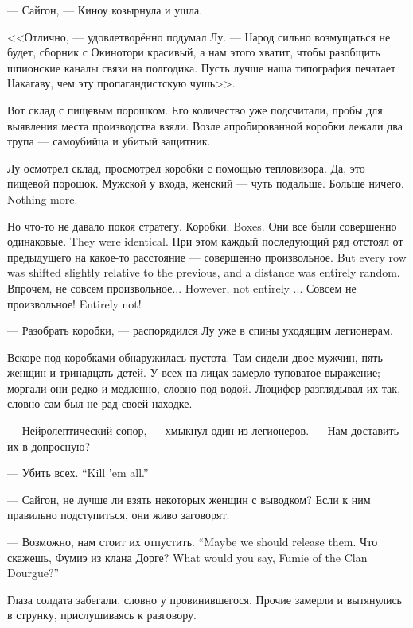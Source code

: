 --- Сайгон, --- Киноу козырнула и ушла.

<<Отлично, --- удовлетворённо подумал Лу.
--- Народ сильно возмущаться не будет, сборник с Окинотори красивый, а нам этого хватит, чтобы разобщить шпионские каналы связи на полгодика.
Пусть лучше наша типография печатает Накагаву, чем эту пропагандистскую чушь>>.

Вот склад с пищевым порошком.
Его количество уже подсчитали, пробы для выявления места производства взяли.
Возле апробированной коробки лежали два трупа --- самоубийца и убитый защитник.

Лу осмотрел склад, просмотрел коробки с помощью тепловизора.
Да, это пищевой порошок.
Мужской у входа, женский --- чуть подальше.
{Больше ничего.}
{Nothing more.}

Но что-то не давало покоя стратегу.
{Коробки.}
{Boxes.}
{Они все были совершенно одинаковые.}
{They were identical.}
{При этом каждый последующий ряд отстоял от предыдущего на какое-то расстояние --- совершенно произвольное.}
{But every row was shifted slightly relative to the previous, and a distance was entirely random.}
{Впрочем, не совсем произвольное...}
{However, not entirely ...}
{Совсем не произвольное!}
{Entirely not!}

--- Разобрать коробки, --- распорядился Лу уже в спины уходящим легионерам.

Вскоре под коробками обнаружилась пустота.
Там сидели двое мужчин, пять женщин и тринадцать детей.
У всех на лицах замерло туповатое выражение;
моргали они редко и медленно, словно под водой.
Люцифер разглядывал их так, словно сам был не рад своей находке.

--- Нейролептический сопор, --- хмыкнул один из легионеров.
--- Нам доставить их в допросную?

{--- Убить всех.}
{``Kill 'em all.''}

--- Сайгон\FM, не лучше ли взять некоторых женщин с выводком?
Если к ним правильно подступиться, они живо заговорят.

{--- Возможно, нам стоит их отпустить.}
{``Maybe we should release them.}
{Что скажешь, Фумиэ из клана Дорге?}
{What would you say, Fumie of the Clan Dourgue?''}

Глаза солдата забегали, словно у провинившегося.
Прочие замерли и вытянулись в струнку, прислушиваясь к разговору.

